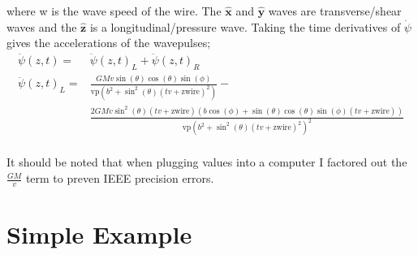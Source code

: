 \documentclass{report}
\begin{document}
where w is the wave speed of the wire. The $\mathbf{\hat x}$ and $\mathbf{\hat y}$ waves are transverse/shear waves and the $\mathbf{\hat z}$ is a longitudinal/pressure wave.
Taking the time derivatives of $\dot{\psi}$ gives the accelerations of the wavepulses;
\begin{align}
    \ddot{\psi} (z, t) =& {\ddot{\psi} (z, t)}_L + {\ddot{\psi} (z, t)}_R\\
    \nonumber {\ddot{\psi} (z, t)}_L =& \frac{G M v \sin (\theta ) \cos (\theta ) \sin (\phi )}{\text{vp} \left(b^2+\sin ^2(\theta ) (t v+\text{zwire})^2\right)}-\\
    & \frac{2 G M v \sin ^2(\theta ) (t v+\text{zwire}) (b \cos (\phi )+\sin (\theta ) \cos (\theta ) \sin (\phi ) (t v+\text{zwire}))}{\text{vp} \left(b^2+\sin ^2(\theta ) (t v+\text{zwire})^2\right)^2}\\
\end{align}

It should be noted that when plugging values into a computer I factored out the $\frac{G M}{v}$ term to preven IEEE precision errors.
\section{Simple Example}
\end{document}
